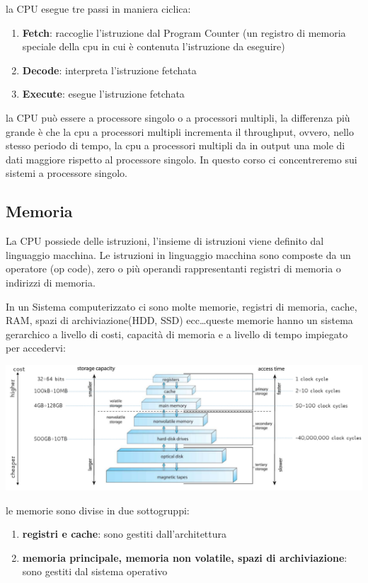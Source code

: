 \documentclass{article}
\begin{document}
        la CPU esegue tre passi in maniera ciclica:
        
        \begin{enumerate}
            \item \textbf{Fetch}:
            raccoglie l'istruzione dal Program Counter (un registro di memoria speciale della cpu in cui è contenuta l'istruzione da eseguire)

            \item \textbf{Decode}:
            interpreta l'istruzione fetchata

            \item \textbf{Execute}:
            esegue l'istruzione fetchata
        \end{enumerate}
        la CPU può essere a processore singolo o a processori multipli, la differenza più grande è che la cpu a processori multipli incrementa il throughput, ovvero, nello stesso periodo di tempo, la cpu a processori multipli da in output una mole di dati maggiore rispetto al processore singolo. In questo corso ci concentreremo sui sistemi a processore singolo.

    \subsection{Memoria}
        La CPU possiede delle istruzioni, l'insieme di istruzioni viene definito dal linguaggio macchina. Le istruzioni in linguaggio macchina sono composte da un operatore (op code), zero o più operandi rappresentanti registri di memoria o indirizzi di memoria.
        
        In un Sistema computerizzato ci sono molte memorie, registri di memoria, cache, RAM, spazi di archiviazione(HDD, SSD) ecc\ldots queste memorie hanno un sistema gerarchico a livello di costi, capacità di memoria e a livello di tempo impiegato per accedervi:

        \begin{center}
            \includegraphics[width=1\textwidth]{immagini/gerarchia memorie.png}
        \end{center}
        le memorie sono divise in due sottogruppi:
        \begin{enumerate}
            \item \textbf{registri e cache}:
            sono gestiti dall'architettura

            \item \textbf{memoria principale, memoria non volatile, spazi di archiviazione}:
            sono gestiti dal sistema operativo
        \end{enumerate}
\end{document}

